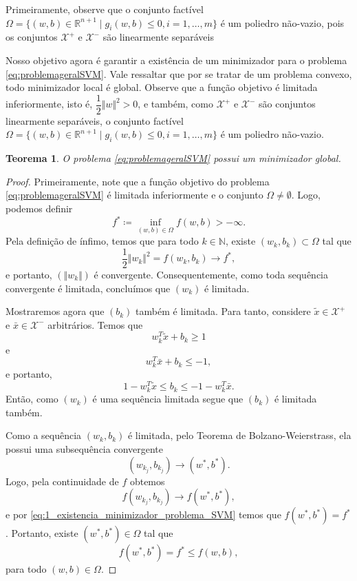 \documentclass[12pt,a4paper]{scrartcl}
\def\Xset{\mathcal{X}}
\def\RR{\mathds{R}}
\def\xbar{\bar{x}}
\newtheorem{teo}{Teorema}
\theoremstyle{definition}%
\begin{document}
Primeiramente, observe que o conjunto factível $\Omega = \{ (w,b) \in \RR^{n+1} \mid g_{i}(w,b) \leq 0, i = 1, \ldots , m \}$ é um poliedro não-vazio, pois os conjuntos $\Xset^{+}$ e $\Xset^{-}$ são linearmente separáveis

Nosso objetivo agora é garantir a existência de um minimizador para o problema \eqref{eq:problemageralSVM}. Vale ressaltar que por se tratar de um problema convexo, todo minimizador local é global. Observe que a função objetivo é limitada inferiormente, isto é, $\dfrac{1}{2}\Vert w \Vert^{2} >0$, e também, como $\Xset^{+}$ e $\Xset^{-}$ são conjuntos linearmente separáveis, o conjunto factível $\Omega = \{ (w,b) \in \RR^{n+1} \mid g_{i}(w,b) \leq 0, i = 1, \ldots , m \}$ é um poliedro não-vazio.

\begin{teo} \label{teo:existencia_minimizador_problema_SVM}
O problema \eqref{eq:problemageralSVM} possui um minimizador global.
\end{teo}
\begin{proof}
Primeiramente, note que a função objetivo do problema \eqref{eq:problemageralSVM} é limitada inferiormente e o conjunto $\Omega \neq \emptyset$. Logo, podemos definir
\[
f^{*} \coloneqq \inf_{(w,b) \in \Omega} f(w,b) > -\infty .
\]
Pela definição de ínfimo, temos que para todo $k \in \mathds{N}$, existe $(w_{k},b_{k}) \subset \Omega$ tal que
\[ \label{eq:1_existencia_minimizador_problema_SVM}
\dfrac{1}{2}\Vert w_{k} \Vert^{2} = f(w_{k}, b_{k}) \rightarrow f^{*} ,
\]
e portanto, $(\Vert w_{k} \Vert )$ é convergente. Consequentemente, como toda sequência convergente é limitada, concluímos que $(w_{k})$ é limitada.

Mostraremos agora que $(b_{k})$ também é limitada. Para tanto, considere $\tilde{x} \in \Xset^{+}$ e $\xbar \in \Xset^{-}$ arbitrários. Temos que 
\[
w_{k}^{T}\tilde{x} + b_{k} \geq 1
\]
e
\[
w_{k}^{T}\xbar + b_{k} \leq -1,
\]
e portanto,
\[
1-w_{k}^{T}\tilde{x} \leq b_{k} \leq -1-w_{k}^{T}\xbar .
\]
Então, como $(w_{k})$ é uma sequência limitada segue que $(b_{k})$ é limitada também. 

Como a sequência $(w_{k}, b_{k})$ é limitada, pelo Teorema de Bolzano-Weierstrass, ela possui uma subsequência convergente 
\[
(w_{k_{j}}, b_{k_{j}}) \rightarrow (w^{*}, b^{*}).
\]
Logo, pela continuidade de $f$ obtemos
\[
f(w_{k_{j}}, b_{k_{j}}) \rightarrow f(w^{*}, b^{*}),
\]
e por \eqref{eq:1_existencia_minimizador_problema_SVM} temos que $f(w^{*}, b^{*}) = f^{*}$. Portanto, existe $(w^{*}, b^{*}) \in \Omega$ tal que
\[
f(w^{*}, b^{*}) = f^{*} \leq f(w,b),
\]
para todo $(w,b) \in \Omega$.
\end{proof}
\end{document}
